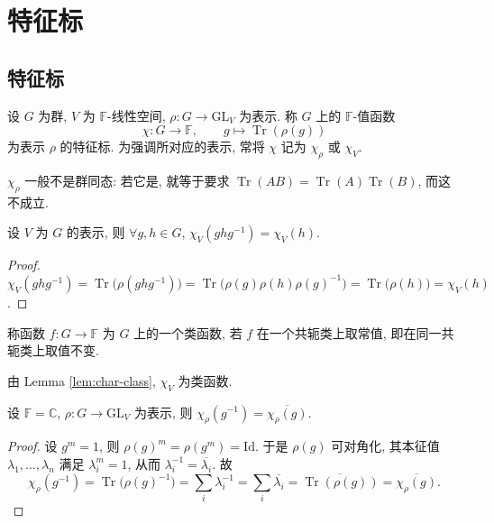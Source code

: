 \section{特征标}

\subsection{特征标}

\begin{definition}[特征标]\label{def:character}
设 $G$ 为群, $V$ 为 $\mathbb{F}$-线性空间, $\rho\colon G\to\mathrm{GL}_V$ 为表示.
称 $G$ 上的 $\mathbb{F}$-值函数
\[
  \chi\colon G\to\mathbb{F},\qquad g\longmapsto \operatorname{Tr}(\rho(g))
\]
为表示 $\rho$ 的特征标. 为强调所对应的表示, 常将 $\chi$ 记为 $\chi_\rho$ 或 $\chi_V$.
\end{definition}

\begin{remark}\label{rem:character-not-homomorphism}
$\chi_\rho$ 一般不是群同态: 若它是, 就等于要求
$\operatorname{Tr}(AB)=\operatorname{Tr}(A)\operatorname{Tr}(B)$, 而这不成立.
\end{remark}

\begin{lemma}\label{lem:char-class}
设 $V$ 为 $G$ 的表示, 则 $\forall g,h\in G$, $\chi_V(ghg^{-1})=\chi_V(h)$.
\end{lemma}

\begin{proof}
$\chi_V(ghg^{-1})=\operatorname{Tr}\bigl(\rho(ghg^{-1})\bigr)
=\operatorname{Tr}\bigl(\rho(g)\rho(h)\rho(g)^{-1}\bigr)=\operatorname{Tr}\bigl(\rho(h)\bigr)=\chi_V(h)$.
\end{proof}

\begin{definition}[类函数]\label{def:class-function}
称函数 $f\colon G\to\mathbb{F}$ 为 $G$ 上的一个类函数, 若 $f$ 在一个共轭类上取常值,
即在同一共轭类上取值不变.
\end{definition}

\begin{remark}\label{rem:character-class-function}
由 Lemma \ref{lem:char-class}, $\chi_V$ 为类函数.
\end{remark}

\begin{lemma}\label{lem:char-inverse}
设 $\mathbb{F}=\mathbb{C}$, $\rho\colon G\to\mathrm{GL}_V$ 为表示, 则
$\chi_\rho(g^{-1})=\overline{\chi_\rho(g)}$.
\end{lemma}

\begin{proof}
设 $g^m=1$, 则 $\rho(g)^m=\rho(g^m)=\mathrm{Id}$. 于是 $\rho(g)$ 可对角化, 其本征值
$\lambda_1,\dots,\lambda_n$ 满足 $\lambda_i^m=1$, 从而 $\lambda_i^{-1}=\overline{\lambda_i}$. 故
\[
  \chi_\rho(g^{-1})=\operatorname{Tr}\bigl(\rho(g)^{-1}\bigr)=\sum_i\lambda_i^{-1}
  =\sum_i\overline{\lambda_i}=\overline{\operatorname{Tr}(\rho(g))}=\overline{\chi_\rho(g)}.
\]
\end{proof}

